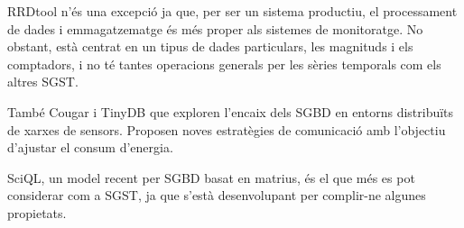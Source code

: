 RRDtool n'és una excepció ja que, per ser un sistema productiu, el processament de dades i emmagatzematge és més proper als sistemes de monitoratge. No obstant, està centrat en un tipus de dades particulars, les magnituds i els comptadors, i no té tantes operacions generals per les sèries temporals com els altres SGST.

També Cougar i TinyDB que exploren l'encaix dels SGBD en entorns distribuïts de xarxes de sensors. Proposen noves estratègies de comunicació amb l'objectiu d'ajustar el consum d'energia. 


SciQL, un model recent per SGBD  basat en matrius, és el que més es pot considerar com a SGST, ja que s'està desenvolupant per complir-ne algunes propietats.












